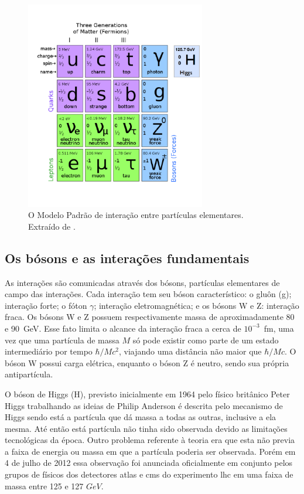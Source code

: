 \begin{figure}[ht!]
\centering
\includegraphics[width=0.7\textwidth]{figures/standard_model.pdf}
\caption[O Modelo Padrão de interação entre as partículas elementares]{
O Modelo Padrão de interação entre partículas elementares. Extraído de
\cite{tese_torres}.}
\label{fig:modelo_padrao}
\end{figure}

\subsection{Os bósons e as interações fundamentais}

As interações são comunicadas através dos bósons, partículas elementares
de campo das interações. Cada interação tem seu bóson característico: o gluôn (g); interação forte; 
o fóton $\gamma$; interação eletromagnética; e os bósons W e Z: interação fraca. Os bósons W e Z 
possuem respectivamente massa de aproximadamente 80 e 90~GeV. Esse fato limita o alcance da 
interação fraca a cerca de $10^{-3}$~fm, uma vez que uma partícula de massa $M$ só pode existir como 
parte de um estado intermediário por tempo $\hbar/Mc^2$, viajando uma distância não maior que
$\hbar/Mc$. O bóson W possui carga elétrica, enquanto o bóson Z é neutro, sendo sua própria 
antipartícula.

O bóson de Higgs (H), previsto inicialmente em 1964 pelo físico britânico Peter Higgs trabalhando
as ideias de Philip Anderson é descrita pelo mecanismo de Higgs sendo está a partícula que dá
massa a todas as outras, inclusive a ela mesma. Até então está partícula não tinha sido observada
devido as limitações tecnológicas da época. Outro problema referente à teoria era que esta não previa a faixa
de energia ou massa em que a partícula poderia ser observada. Porém em 4 de julho de 2012 essa observação
foi anunciada oficialmente em conjunto pelos grupos de físicos dos detectores \gls{atlas} e  \gls{cms}  do 
experimento \gls{lhc} em uma faixa de massa entre 125 e 127 $GeV$.

